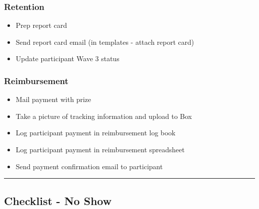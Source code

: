 \documentclass[]{book}
\providecommand{\tightlist}{%
  \setlength{\itemsep}{0pt}\setlength{\parskip}{0pt}}
\begin{document}
\hypertarget{retention-2}{%
\subsubsection{Retention}\label{retention-2}}

\begin{itemize}
\tightlist
\item
  Prep report card
\item
  Send report card email (in templates - attach report card)
\item
  Update participant Wave 3 status
\end{itemize}

\hypertarget{reimbursement-2}{%
\subsubsection{Reimbursement}\label{reimbursement-2}}

\begin{itemize}
\tightlist
\item
  Mail payment with prize
\item
  Take a picture of tracking information and upload to Box
\item
  Log participant payment in reimbursement log book
\item
  Log participant payment in reimbursement spreadsheet
\item
  Send payment confirmation email to participant
\end{itemize}

\begin{center}\rule{0.5\linewidth}{0.5pt}\end{center}

\hypertarget{checklist---no-show-1}{%
\subsection{Checklist - No Show}\label{checklist---no-show-1}}
\end{document}
